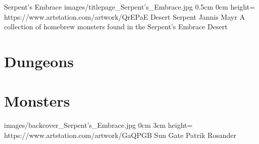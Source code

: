 \documentclass[letterpaper,openany,twoside,twocolumn]{book}
\begin{document}
	\bookTitlePage
		{Serpent's Embrace}
		{images/titlepage_Serpent's_Embrace.jpg}
		{0.5cm}
		{0cm}
		{height=\paperheight}
		{https://www.artstation.com/artwork/QrEPaE}
		{Desert Serpent}
		{Jannis Mayr}
		{A collection of homebrew monsters found in the Serpent's Embrace Desert}
	
	\tableofcontents
	
	\mainmatter
	
	\DungeonSheetGeometry
	\part{Dungeons}
	
	
	\MonsterSheetGeometry
	\part{Monsters}
	
	
	
	
	\bookLastPage
		{images/backcover_Serpent's_Embrace.jpg}
		{0cm}
		{3cm}
		{height=\paperheight}
		{https://www.artstation.com/artwork/GaQPGB}
		{Sun Gate}
		{Patrik Rosander}
		{}
\end{document}
